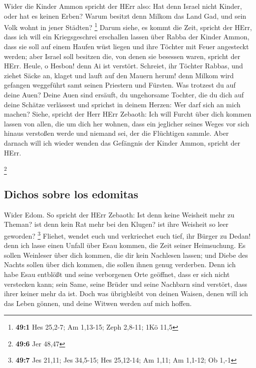  Wider die Kinder Ammon spricht der HErr also: Hat denn
Israel nicht Kinder, oder hat es keinen Erben? Warum besitzt denn Milkom
das Land Gad, und sein Volk wohnt in jener Städten? \footnote{\textbf{49:1}
  Hes 25,2-7; Am 1,13-15; Zeph 2,8-11; 1Kö 11,5}  Darum
siehe, es kommt die Zeit, spricht der HErr, dass ich will ein
Kriegsgeschrei erschallen lassen über Rabba der Kinder Ammon, dass sie
soll auf einem Haufen wüst liegen und ihre Töchter mit Feuer angesteckt
werden; aber Israel soll besitzen die, von denen sie besessen waren,
spricht der HErr.  Heule, o Hesbon! denn Ai ist verstört.
Schreiet, ihr Töchter Rabbas, und ziehet Säcke an, klaget und lauft auf
den Mauern herum! denn Milkom wird gefangen weggeführt samt seinen
Priestern und Fürsten.  Was trotzest du auf deine Auen?
Deine Auen sind ersäuft, du ungehorsame Tochter, die du dich auf deine
Schätze verlässest und sprichst in deinem Herzen: Wer darf sich an mich
machen?  Siehe, spricht der Herr HErr Zebaoth: Ich will
Furcht über dich kommen lassen von allen, die um dich her wohnen, dass
ein jeglicher seines Weges vor sich hinaus verstoßen werde und niemand
sei, der die Flüchtigen sammle.  Aber darnach will ich
wieder wenden das Gefängnis der Kinder Ammon, spricht der HErr.

\footnote{\textbf{49:6} Jer 48,47}

\hypertarget{dichos-sobre-los-edomitas}{%
\subsection{Dichos sobre los edomitas}\label{dichos-sobre-los-edomitas}}

 Wider Edom. So spricht der HErr Zebaoth: Ist denn keine
Weisheit mehr zu Theman? ist denn kein Rat mehr bei den Klugen? ist ihre
Weisheit so leer geworden? \footnote{\textbf{49:7} Jes 21,11; Jes
  34,5-15; Hes 25,12-14; Am 1,11; Am 1,1-12; Ob 1,-1} 
Fliehet, wendet euch und verkriechet euch tief, ihr Bürger zu Dedan!
denn ich lasse einen Unfall über Esau kommen, die Zeit seiner
Heimsuchung.  Es sollen Weinleser über dich kommen, die
dir kein Nachlesen lassen; und Diebe des Nachts sollen über dich kommen,
die sollen ihnen genug verderben.  Denn ich habe Esau
entblößt und seine verborgenen Orte geöffnet, dass er sich nicht
verstecken kann; sein Same, seine Brüder und seine Nachbarn sind
verstört, dass ihrer keiner mehr da ist.  Doch was
übrigbleibt von deinen Waisen, denen will ich das Leben gönnen, und
deine Witwen werden auf mich hoffen.

